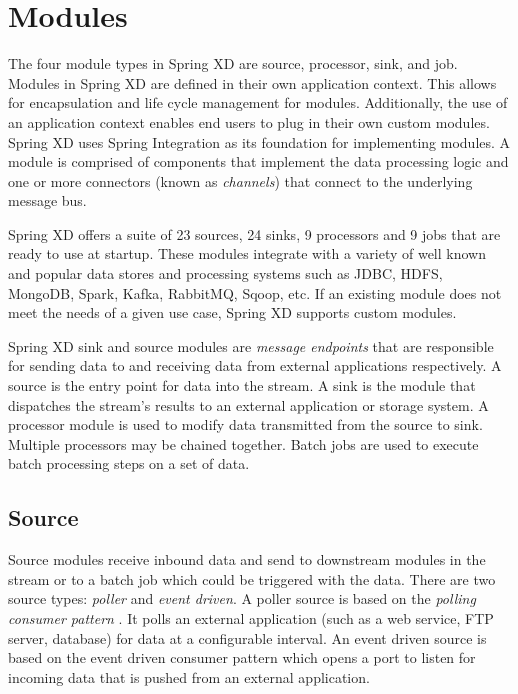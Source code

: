 \section{Modules}
\label{sec:Modules}
The four module types in Spring XD are source, processor, sink, and job. Modules
in Spring XD are defined in their own application context. This allows for encapsulation
and life cycle management for modules. Additionally, the use of an application context
enables end users to plug in their own custom modules. Spring XD uses Spring 
Integration as its foundation for implementing modules. A module is comprised of components that
implement the data processing logic and one or more connectors (known as \emph{channels})
that connect to the underlying message bus.

\par

Spring XD offers a suite of 23 sources, 24 sinks, 9 processors and 9 jobs that are ready
to use at startup.  These modules integrate with a variety of well known and popular
data stores and processing systems such as JDBC\cite{jdbc}, HDFS, MongoDB\cite{mongodb},
Spark, Kafka, RabbitMQ, Sqoop, etc.  If an existing module does not meet the needs of a
given use case, Spring XD supports custom modules.

Spring XD sink and source modules are \emph{message endpoints}
\cite{enterprise-integration-pattern-message-endpoint}
that are responsible for sending data to and receiving data from external applications
respectively. A source is the entry point for data into the stream. A sink is
the module that dispatches the stream's results to an external application or storage system.
A processor module is used to modify data transmitted from the source to sink.
Multiple processors may be chained together. Batch jobs are used to execute batch
processing steps on a set of data.

\par

\subsection{Source}
\label{sec:Source}
Source modules receive inbound data and send to downstream modules in the stream or to a batch job
which could be triggered with the data. There are two source types: \emph{poller} and \emph{event driven}.
A poller source is based on the \emph{polling consumer pattern}
\cite{enterprise-integration-pattern-pollingconsumer}.
It polls an external application (such as a web service, FTP server, database) for data at a
configurable interval. An event driven source is based on the event driven
consumer pattern \cite{enterprise-integration-pattern-eventdrivenconsumer} which
opens a port to listen for incoming data that is pushed from an external application.

